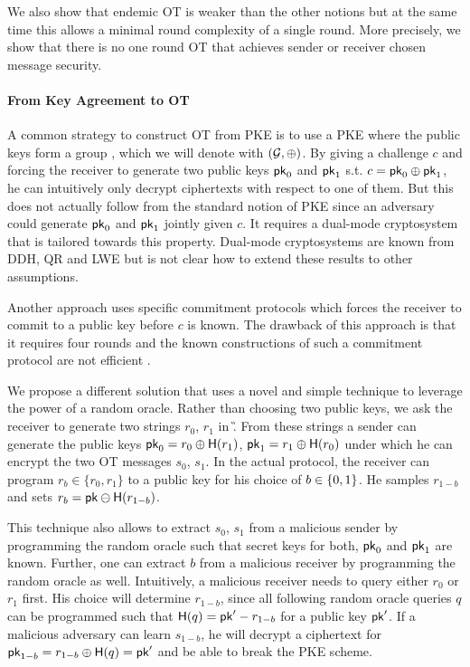 We also show that endemic OT is weaker than the other notions but at the same time this allows a minimal round complexity of a single round. More precisely, we show that there is no one round OT that achieves sender or receiver chosen message security.

\paragraph{From Key Agreement to OT} A common strategy to construct OT from PKE is to use a PKE where the public keys form a group \cite{C:PeiVaiWat08,EPRINT:BDDMN17b}, which we will denote with $(\mathcal{G},\oplus)$. By giving a challenge $c$ and forcing the receiver to generate two public keys $\mathsf{pk}_0$ and $\mathsf{pk}_1$ s.t. $c=\mathsf{pk}_0\oplus \mathsf{pk}_1$, he can intuitively only decrypt ciphertexts with respect to one of them. But this does not actually follow from the standard notion of PKE since an adversary could generate $\mathsf{pk}_0$ and $\mathsf{pk}_1$ jointly given $c$. It requires a dual-mode cryptosystem \cite{C:PeiVaiWat08, TCC:GarIshSri18} that is tailored towards this property. Dual-mode cryptosystems are known from DDH, QR and LWE \cite{C:PeiVaiWat08} but is not clear how to extend these results to other assumptions.

Another approach \cite{C:OstRicSca15,cryptoeprint:2018:473} uses specific commitment protocols which forces the receiver to commit to a public key before $c$ is known. The drawback of this approach is that it requires four rounds and the known constructions of such a commitment protocol are not efficient \cite{STOC:Kilian92,C:OstRicSca15}. 

We propose a different solution that uses a novel and simple technique to leverage the power of a random oracle. Rather than choosing two public keys, we ask the receiver to generate two strings $r_0$, $r_1$ in \G. From these strings a sender can generate the public keys $\mathsf{pk}_0=r_0\oplus\mathsf{H}(r_1)$, $\mathsf{pk}_1=r_1\oplus\mathsf{H}(r_0)$ under which he can encrypt the two OT messages $s_0$, $s_1$.
In the actual protocol, the receiver can program $r_b\in \{r_0,r_1\}$ to a public key 
for his choice of $b\in\{0,1\}$. He samples $r_{1-b}$ and sets $r_b=\mathsf{pk}\ominus\mathsf{H}(r_{1-b})$.

This technique also allows to extract $s_0$, $s_1$ from a malicious sender by programming the random oracle such that secret keys for both, $\mathsf{pk}_0$ and $\mathsf{pk}_1$ are known. Further, one can extract $b$ from a malicious receiver by programming the random oracle as well. Intuitively, a malicious receiver needs to query either $r_0$ or $r_1$ first. His choice will determine $r_{1-b}$, since all following random oracle queries $q$ can be programmed such that $\mathsf{H}(q)=\mathsf{pk}'-r_{1-b}$ for a public key $\mathsf{pk}'$. If a malicious adversary can learn $s_{1-b}$, he will decrypt a ciphertext for $\mathsf{pk}_{1-b}=r_{1-b}\oplus\mathsf{H}(q)=\mathsf{pk}'$ and be able to break the PKE scheme.

